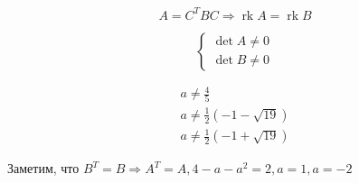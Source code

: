 \begin{solution}
	$$
	A=C^{T} B C
	\Longrightarrow 
	\operatorname{r k} A=\operatorname{r k} B
	$$
	
	$$
	\left\{\begin{array}{l}{\operatorname{det} A \neq 0} \\ {\operatorname{det} B \neq 0}\end{array}\right.
	$$
	
	$$
	\begin{array}{l}{a \neq \frac{4}{5}} \\ {a \neq \frac{1}{2}(-1-\sqrt{19})} \\ {a \neq \frac{1}{2}(-1+\sqrt{19})}\end{array}
	$$
	
	Заметим, что  $
	B^{T}=B \Longrightarrow 
	A^{T}=A , 
	4-a-a^{2}=2 , a = 1 , a = -2	
	$
\end{solution}


				